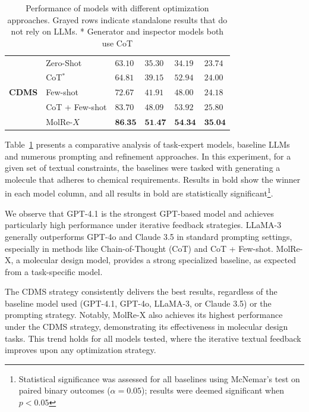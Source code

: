 \documentclass[10pt]{article} %
\begin{document}
\begin{table}[h!]
\begin{tabular}{llp{1.5cm}p{1.5cm}p{1.5cm}p{1.5cm}}
        \midrule
        \multirow{5}{*}{\textbf{CDMS}}
        & Zero-Shot                        & $63.10$ & $35.30$          & $34.19$          & $23.74$            \\
        & CoT$^*$                          & $64.81$ & $39.15$          & $52.94$          & $24.00$            \\
        & Few-shot                         & $72.67$ & $41.91$          & $48.00$          & $24.18$            \\
        & CoT + Few-shot                  & $83.70$ & $48.09$          & $53.92$          & $25.80$            \\
        & MolRe-$X$                        & $\textbf{86.35}$ & $\textbf{51.47}$ & $\textbf{54.34}$   & $\textbf{35.04}$    \\
        \bottomrule
    \end{tabular}

    \caption{Performance of models with different optimization approaches. Grayed rows indicate standalone results that do not rely on LLMs. * Generator and inspector models both use CoT }
    \label{tab:model_results}
\end{table}

Table~\ref{tab:model_results} presents a comparative analysis of task-expert models, baseline LLMs and numerous prompting and refinement approaches.
In this experiment, for a given set of textual constraints, the baselines were tasked with generating a molecule that adheres to chemical requirements. Results in bold show the winner in each model column, and all results in bold are statistically significant\footnote{Statistical significance was assessed for all baselines using McNemar’s test on paired binary outcomes ($\alpha = 0.05$); results were deemed significant when $p < 0.05$}.

We observe that GPT-4.1 is the strongest GPT-based model and achieves particularly high performance under iterative feedback strategies. LLaMA-3 generally outperforms GPT-4o and Claude 3.5 in standard prompting settings, especially in methods like Chain-of-Thought (CoT) and CoT + Few-shot. MolRe-X, a molecular design model, provides a strong specialized baseline, as expected from a task-specific model.

The CDMS strategy consistently delivers the best results, regardless of the baseline model used (GPT-4.1, GPT-4o, LLaMA-3, or Claude 3.5) or the prompting strategy. Notably, MolRe-X also achieves its highest performance under the CDMS strategy, demonstrating its effectiveness in molecular design tasks. This trend holds for all models tested, where the iterative textual feedback improves upon any optimization strategy. 
\end{document}
